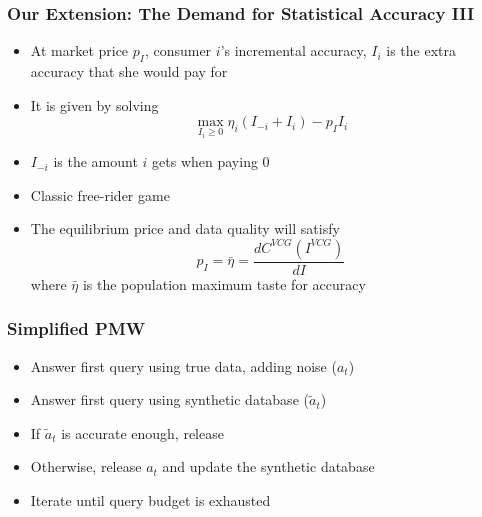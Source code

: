 \begin{frame}[allowframebreaks]%
\frametitle{Our Extension: The Demand for Statistical Accuracy III}
\begin{itemize}
	
	\item At market price $p_I$, consumer $i$'s incremental accuracy, $I_{i}$ is the extra accuracy that she would pay for
    \item It is given by solving%
\begin{equation}
\max_{I_{i}\geq 0}\eta _{i}\left( I_{-i}+I_{i}\right) -p_II_{i}
\end{equation}%
    \item $I_{-i}$ is the amount $i$ gets when paying 0
    \item Classic free-rider game
	\item The equilibrium price and data quality will satisfy%
\begin{equation*}
p_I=\bar{\eta}=\frac{dC^{VCG}\left( I^{VCG}\right) }{dI}
\end{equation*}%
where $\bar{\eta}$ is the population maximum taste for accuracy
\end{itemize}



\end{frame}%
%



\begin{frame}[allowframebreaks]%
\frametitle{Simplified PMW}
\begin{itemize}
	\item Answer first query using true data, adding noise ($a_t$)
	\item Answer first query using synthetic database ($\tilde{a}_t$)
	\item If $\tilde{a}_t$ is accurate enough, release
	\item Otherwise, release $a_t$ and update the synthetic database
	\item Iterate until query budget is exhausted
\end{itemize}

\end{frame}%
%

